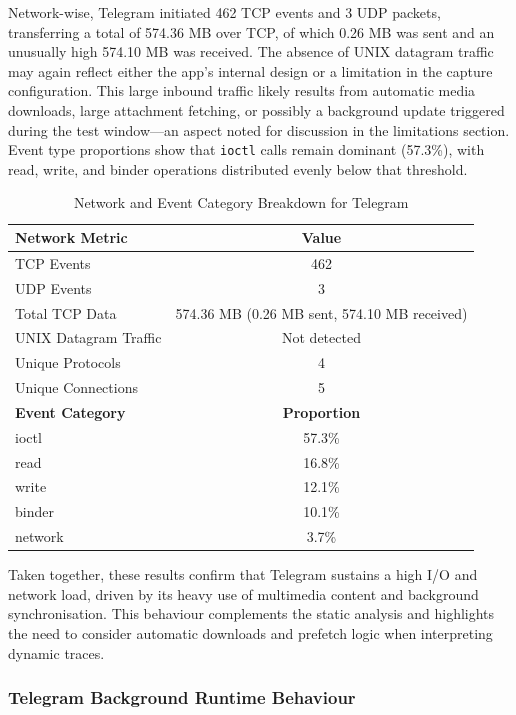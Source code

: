 \documentclass[a4paper,12pt]{report}
\begin{document}
Network-wise, Telegram initiated 462 TCP events and 3 UDP packets, transferring a total of 574.36 MB over TCP, of which 0.26 MB was sent and an unusually high 574.10 MB was received. The absence of UNIX datagram traffic may again reflect either the app’s internal design or a limitation in the capture configuration. This large inbound traffic likely results from automatic media downloads, large attachment fetching, or possibly a background update triggered during the test window—an aspect noted for discussion in the limitations section. Event type proportions show that \texttt{ioctl} calls remain dominant (57.3\%), with read, write, and binder operations distributed evenly below that threshold.

\begin{table}[H]
    \centering
    \caption{Network and Event Category Breakdown for Telegram}
    \label{tab:telegram_network_category}
    \begin{tabular}{|l|c|}
        \hline
        \textbf{Network Metric} & \textbf{Value} \\
        \hline
        TCP Events & 462 \\
        UDP Events & 3 \\
        Total TCP Data & 574.36 MB (0.26 MB sent, 574.10 MB received) \\
        UNIX Datagram Traffic & Not detected \\
        Unique Protocols & 4 \\
        Unique Connections & 5 \\
        \hline
        \textbf{Event Category} & \textbf{Proportion} \\
        \hline
        ioctl & 57.3\% \\
        read & 16.8\% \\
        write & 12.1\% \\
        binder & 10.1\% \\
        network & 3.7\% \\
        \hline
    \end{tabular}
\end{table}

Taken together, these results confirm that Telegram sustains a high I/O and network load, driven by its heavy use of multimedia content and background synchronisation. This behaviour complements the static analysis and highlights the need to consider automatic downloads and prefetch logic when interpreting dynamic traces.

\subsubsection{Telegram Background Runtime Behaviour}
\end{document}
